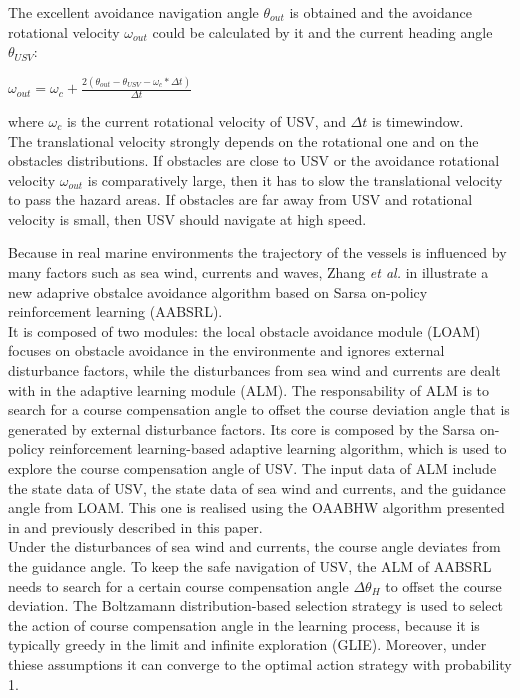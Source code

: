 \documentclass[journal]{IEEEtran}
\begin{document}
              The excellent avoidance navigation angle $\theta_{out}$ is obtained and the avoidance rotational velocity $\omega_{out}$ could be calculated by it and the current heading angle $\theta_{USV}$:
                  \begin{center}
                        $\omega_{out} = \omega_c + \frac{2(\theta_{out} - \theta_{USV} -\omega_c * \Delta t)}{\Delta t}$
                  \end{center}
              where $\omega_c$ is the current rotational velocity of USV, and $\Delta t$ is time\-window.\\
              The translational velocity strongly depends on the rotational one and on the obstacles distributions. If obstacles are close to USV or the avoidance rotational velocity $\omega_{out}$ is comparatively large, then it has to slow the translational velocity to pass the hazard areas. If obstacles are far away from USV and rotational velocity is small, then USV should navigate at high speed.

              \indent Because in real marine environments the trajectory of the vessels is influenced by many factors such as sea wind, currents and waves, Zhang \textit{et al.} in \parencite{Zhang2014} illustrate a new adaprive obstalce avoidance algorithm based on Sarsa on-policy reinforcement learning (AABSRL).\\
              It is composed of two modules: the local obstacle avoidance module (LOAM) focuses on obstacle avoidance in the environmente and ignores external disturbance factors, while the disturbances from sea wind and currents are dealt with in the adaptive learning module (ALM). The responsability of ALM is to search for a course compensation angle to offset the course deviation angle that is generated by external disturbance factors. Its core is composed by the Sarsa on-policy reinforcement learning-based adaptive learning algorithm, which is used to explore the course compensation angle of USV. The input data of ALM include the state data of USV, the state data of sea wind and currents, and the guidance angle from LOAM. This one is realised using the OAABHW algorithm presented in \parencite{Tang2012} and previously described in this paper.\\
              Under the disturbances of sea wind and currents, the course angle deviates from the guidance angle. To keep the safe navigation of USV, the ALM of AABSRL needs to search for a certain course compensation angle $\Delta \theta_H $ to offset the course deviation. The Boltzamann distribution-based selection strategy is used to select the action of course compensation angle in the learning process, because it is typically greedy in the limit and infinite exploration (GLIE). Moreover, under thiese assumptions it can converge to the optimal action strategy with probability 1.
\end{document}
